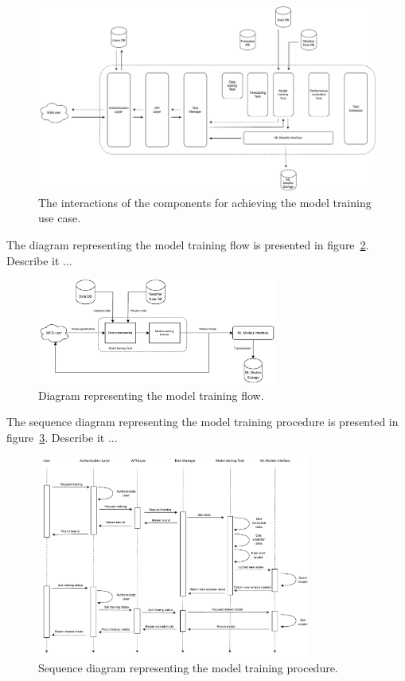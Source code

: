 \begin{figure}[H]
\centering
\includegraphics[width=1\textwidth]{images/architecture_training_interactions}
\caption{The interactions of the components for achieving the model training use case.}
\label{fig:traininginteractions}
\end{figure}

The diagram representing the model training flow is presented in figure~\ref{fig:trainingflow}.
Describe it ...

\begin{figure}[H]
\centering
\includegraphics[width=0.7\textwidth]{images/architecture_training_flow}
\caption{Diagram representing the model training flow.}
\label{fig:trainingflow}
\end{figure}

The sequence diagram representing the model training procedure is presented in figure~\ref{fig:trainingsequence}.
Describe it ...

\begin{figure}[H]
\centering
\includegraphics[width=0.8\textwidth]{images/architecture_training_sequence}
\caption{Sequence diagram representing the model training procedure.}
\label{fig:trainingsequence}
\end{figure}


